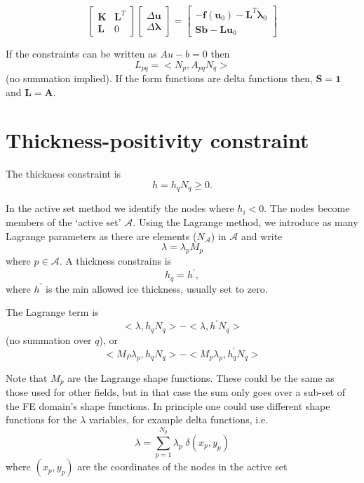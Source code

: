 \documentclass[10pt,a4paper]{book}
\begin{document}
\[
\left [ \begin{array}{cc}
\bm{K} & \bm{L}^T  \\
\bm{L} & 0 
\end{array} \right ]
\left [ \begin{array}{c}
\Delta \bm{u} \\
\Delta \bm{\lambda}
\end{array} \right ]
=\left [ \begin{array}{c}
-\bm{f}(\bm{u}_0) - \bm{L}^T \bm{\lambda}_0 \\
\bm{S} \bm{b} - \bm{L} \bm{u}_0
\end{array} \right ]
\]


If the constraints can be written as $A u-b=0$ then
\[
L_{pq}=<N_p,A_{pq} N_q>
\]
(no summation implied).  If the form functions are delta functions
then, $\bm{S}=\bm{1}$ and $\bm{L}=\bm{A}$.


\section{Thickness-positivity constraint}
The thickness constraint is
\[ h=h_q N_q \ge 0 .\]


In the active set method we identify the nodes where $h_i < 0$. The
nodes become members of the `active set' $\mathcal{A}$. Using the
Lagrange method, we introduce as many Lagrange parameters as there are
elements ($N_{\mathcal{A}}$) in $\mathcal{A}$ and write
\[
\lambda = \lambda_p M_p
\]
where $p \in \mathcal{A}$. A thickness constrains  is 
\[
 h_q=h^{'}  ,
\]
where $h^{'}$ is the min allowed ice thickness, usually set to zero.

The Lagrange term is
\[
<\lambda , h_q N_q> - < \lambda, h^{'} N_q> 
\]
(no summation over $q$), or
\[
< M_P \lambda_p, h_q N_q>- <M_p \lambda_p, h^{'}_q N_q>
\]

Note that $M_p$ are the Lagrange shape
functions. These could be the same as those used for other fields, but
in that case the sum only goes over a sub-set of the FE domain's shape
functions. In principle one could use different shape functions for
the $\lambda$ variables, for example delta functions, i.e.\
\[
\lambda=\sum_{p=1}^{N_p} \lambda_p \;\delta(x_p,y_p)
\]
where $(x_p,y_p)$ are the coordinates of the nodes in the active set
\end{document}
